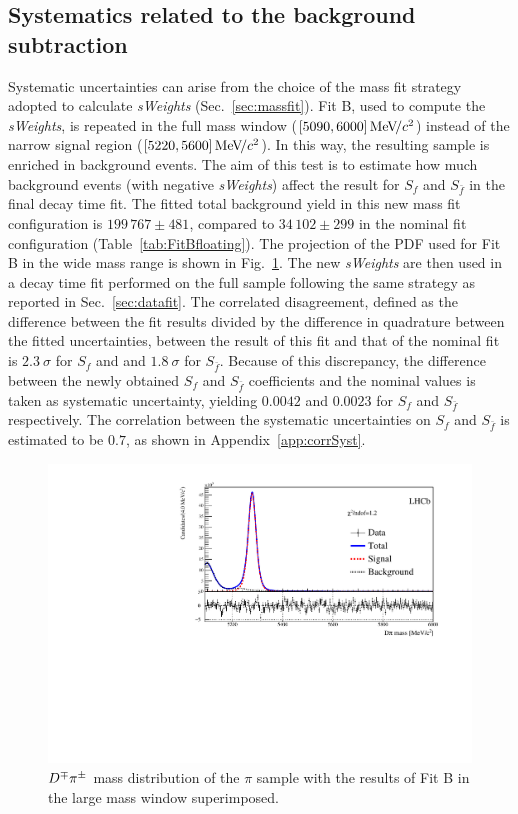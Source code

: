 \subsection{Systematics related to the background subtraction}
\label{sec:syst_mass}
Systematic uncertainties can arise from the choice of the mass fit strategy adopted to calculate \emph{sWeights} (Sec.~\ref{sec:massfit}).
Fit B, used to compute the \emph{sWeights}, is repeated in the full mass window ($[5090,6000]{\mathrm{\,Me\kern -0.1em V\!/}c^2}$) instead of the narrow signal region ($[5220,5600]{\mathrm{\,Me\kern -0.1em V\!/}c^2}$).
In this way, the resulting sample is enriched in background events.
The aim of this test is to estimate how much background events (with negative \emph{sWeights}) affect the result for $S_f$ and $S_{\bar f}$ in the final decay time fit.
The fitted total background yield in this new mass fit configuration is $199\,767\pm481$, compared to $34\,102\pm299$ in the nominal fit configuration (Table~\ref{tab:FitBfloating}).
The projection of the PDF used for Fit B in the wide mass range is shown in Fig.~\ref{fig:FitBWideMass}. The new \emph{sWeights} 
are then used in a decay time fit performed on the full sample following the same strategy as reported in Sec.~\ref{sec:datafit}. The correlated disagreement, defined as the difference between the fit results divided by the difference in quadrature between the fitted uncertainties, between the result of this fit and that of the nominal fit is $2.3~\sigma$ for $S_f$ and 
and $1.8~\sigma$ for $S_{\bar f}$. 
Because of this discrepancy, the difference between the newly obtained $S_f$ and $S_{\bar f}$ coefficients and the nominal values is taken as systematic uncertainty, yielding $0.0042$ and $0.0023$ for $S_f$ and $S_{\bar f}$ respectively. The correlation between the systematic uncertainties on $S_f$ and $S_{\bar f}$ is estimated to be $0.7$, as shown in Appendix~\ref{app:corrSyst}.

\begin{figure}[t]
        \begin{center}
                \includegraphics[width=0.7\linewidth]{06Systematics/figs/MDFitPlots_Bd_largeWindow/MDFitForSWeights_BeautyMass_Bd2DPi.pdf}
        \end{center}
        \vspace{-2mm}
        \caption{$D^\mp\pi^\pm$ mass distribution of the $\pi$ sample with the results of Fit B in the large mass window superimposed.}
        \label{fig:FitBWideMass}
\end{figure}

